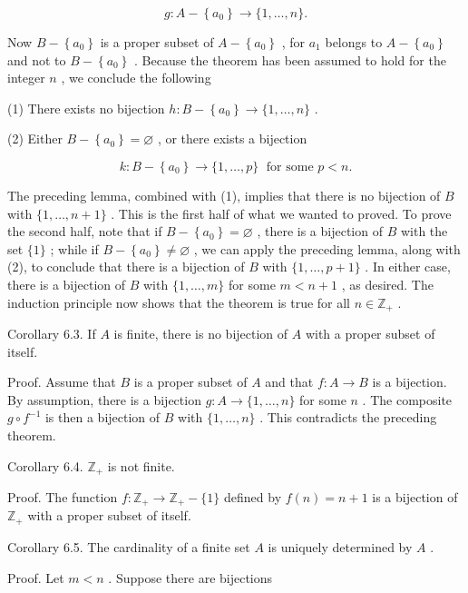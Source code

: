 \[
g : A - \left\{  {a}_{0}\right\}   \rightarrow  \{ 1,\ldots ,n\} .
\]

Now \(B - \left\{  {a}_{0}\right\}\) is a proper subset of \(A - \left\{  {a}_{0}\right\}\) , for \({a}_{1}\) belongs to \(A - \left\{  {a}_{0}\right\}\) and not to \(B - \left\{  {a}_{0}\right\}\) . Because the theorem has been assumed to hold for the integer \(n\) , we conclude the following

(1) There exists no bijection \(h : B - \left\{  {a}_{0}\right\}   \rightarrow  \{ 1,\ldots ,n\}\) .

(2) Either \(B - \left\{  {a}_{0}\right\}   = \varnothing\) , or there exists a bijection

\[
k : B - \left\{  {a}_{0}\right\}   \rightarrow  \{ 1,\ldots ,p\} \;\text{ for some }p < n.
\]

The preceding lemma, combined with (1), implies that there is no bijection of \(B\) with \(\{ 1,\ldots ,n + 1\}\) . This is the first half of what we wanted to proved. To prove the second half, note that if \(B - \left\{  {a}_{0}\right\}   = \varnothing\) , there is a bijection of \(B\) with the set \(\{ 1\}\) ; while if \(B - \left\{  {a}_{0}\right\}   \neq  \varnothing\) , we can apply the preceding lemma, along with (2), to conclude that there is a bijection of \(B\) with \(\{ 1,\ldots ,p + 1\}\) . In either case, there is a bijection of \(B\) with \(\{ 1,\ldots ,m\}\) for some \(m < n + 1\) , as desired. The induction principle now shows that the theorem is true for all \(n \in  {\mathbb{Z}}_{ + }\) .

Corollary 6.3. If \(A\) is finite, there is no bijection of \(A\) with a proper subset of itself.

Proof. Assume that \(B\) is a proper subset of \(A\) and that \(f : A \rightarrow  B\) is a bijection. By assumption, there is a bijection \(g : A \rightarrow  \{ 1,\ldots ,n\}\) for some \(n\) . The composite \(g \circ  {f}^{-1}\) is then a bijection of \(B\) with \(\{ 1,\ldots ,n\}\) . This contradicts the preceding theorem.

Corollary 6.4. \({\mathbb{Z}}_{ + }\) is not finite.

Proof. The function \(f : {\mathbb{Z}}_{ + } \rightarrow  {\mathbb{Z}}_{ + } - \{ 1\}\) defined by \(f\left( n\right)  = n + 1\) is a bijection of \({\mathbb{Z}}_{ + }\) with a proper subset of itself.

Corollary 6.5. The cardinality of a finite set \(A\) is uniquely determined by \(A\) .

Proof. Let \(m < n\) . Suppose there are bijections

